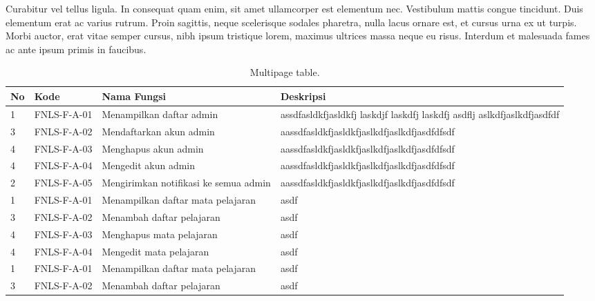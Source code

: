 Curabitur vel tellus ligula. In consequat quam enim, sit amet
ullamcorper est elementum nec. Vestibulum mattis congue
tincidunt. Duis elementum erat ac varius rutrum. Proin sagittis, neque
scelerisque sodales pharetra, nulla lacus ornare est, et cursus urna
ex ut turpis. Morbi auctor, erat vitae semper cursus, nibh ipsum
tristique lorem, maximus ultrices massa neque eu risus. Interdum et
malesuada fames ac ante ipsum primis in faucibus.

\begin{longtable}[c]{|l|l|p{3cm}|p{7cm}|} %
  \caption{Multipage table.}
  \label{tab:table1}\\
  \toprule
  \hline \textbf{No} & \textbf{Kode} & \textbf{Nama Fungsi} & \textbf{Deskripsi}\\ \hline
  \midrule
  \endfirsthead %
  \toprule
  \midrule
  \endhead %
1 & FNLS-F-A-01 & Menampilkan daftar admin & assdfasldkfjasldkfj laskdjf laskdfj  laskdfj asdflj aslkdfjaslkdfjasdfdf\\ \hline
3 & FNLS-F-A-02 & Mendaftarkan akun admin & aassdfasldkfjasldkfjaslkdfjaslkdfjasdfdfsdf\\ \hline
4 & FNLS-F-A-03 & Menghapus akun admin& aassdfasldkfjasldkfjaslkdfjaslkdfjasdfdfsdf\\ \hline
4 & FNLS-F-A-04 & Mengedit akun admin & aassdfasldkfjasldkfjaslkdfjaslkdfjasdfdfsdf\\ \hline
2 & FNLS-F-A-05 & Mengirimkan notifikasi ke semua admin & aassdfasldkfjasldkfjaslkdfjaslkdfjasdfdfsdf\\ \hline
1 & FNLS-F-A-01 & Menampilkan daftar mata pelajaran & asdf\\ \hline
3 & FNLS-F-A-02 & Menambah daftar pelajaran & asdf\\ \hline
4 & FNLS-F-A-03 & Menghapus mata pelajaran & asdf\\ \hline
4 & FNLS-F-A-04 & Mengedit mata pelajaran & asdf\\ \hline
1 & FNLS-F-A-01 & Menampilkan daftar mata pelajaran & asdf\\ \hline
3 & FNLS-F-A-02 & Menambah daftar pelajaran & asdf\\ \hline

\end{longtable}
